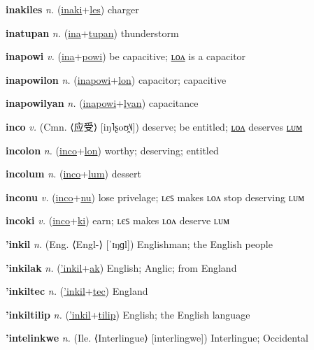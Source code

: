 \textbf{\hypertarget{inakiles}{inakiles}} \textit{n.} (\hyperlink{inaki}{inaki}+\allowbreak \hyperlink{les}{les})
charger

\textbf{\hypertarget{inatupan}{inatupan}} \textit{n.} (\hyperlink{ina}{ina}+\allowbreak \hyperlink{tupan}{tupan})
thunderstorm

\textbf{\hypertarget{inapowi}{inapowi}} \textit{v.} (\hyperlink{ina}{ina}+\allowbreak \hyperlink{powi}{powi})
be capacitive; \hyperlink{inapowilon}{ʟᴏᴧ} is a capacitor

\textbf{\hypertarget{inapowilon}{inapowilon}} \textit{n.} (\hyperlink{inapowi}{inapowi}+\allowbreak \hyperlink{lon}{lon})
capacitor; capacitive

\textbf{\hypertarget{inapowilyan}{inapowilyan}} \textit{n.} (\hyperlink{inapowi}{inapowi}+\allowbreak \hyperlink{lyan}{lyan})
capacitance

\textbf{\hypertarget{inco}{inco}} \textit{v.} (Cmn. ⟨{\chinese{}应受}⟩ [iŋ˥ʂoʊ̯˥˩])
deserve; be entitled; \hyperlink{incolon}{ʟᴏᴧ} deserves \hyperlink{incolum}{ʟᴜᴍ}

\textbf{\hypertarget{incolon}{incolon}} \textit{n.} (\hyperlink{inco}{inco}+\allowbreak \hyperlink{lon}{lon})
worthy; deserving; entitled

\textbf{\hypertarget{incolum}{incolum}} \textit{n.} (\hyperlink{inco}{inco}+\allowbreak \hyperlink{lum}{lum})
dessert

\textbf{\hypertarget{inconu}{inconu}} \textit{v.} (\hyperlink{inco}{inco}+\allowbreak \hyperlink{nu}{nu})
lose privelage; ʟєꜱ makes ʟᴏᴧ stop deserving ʟᴜᴍ

\textbf{\hypertarget{incoki}{incoki}} \textit{v.} (\hyperlink{inco}{inco}+\allowbreak \hyperlink{ki}{ki})
earn; ʟєꜱ makes ʟᴏᴧ deserve ʟᴜᴍ

\textbf{\hypertarget{'inkil}{'inkil}} \textit{n.} (Eng. ⟨Engl-⟩ [ˈɪŋɡl])
Englishman; the English people

\textbf{\hypertarget{'inkilak}{'inkilak}} \textit{n.} (\hyperlink{'inkil}{'inkil}+\allowbreak \hyperlink{ak}{ak})
English; Anglic; from England

\textbf{\hypertarget{'inkiltec}{'inkiltec}} \textit{n.} (\hyperlink{'inkil}{'inkil}+\allowbreak \hyperlink{tec}{tec})
England

\textbf{\hypertarget{'inkiltilip}{'inkiltilip}} \textit{n.} (\hyperlink{'inkil}{'inkil}+\allowbreak \hyperlink{tilip}{tilip})
English; the English language

\textbf{\hypertarget{'intelinkwe}{'intelinkwe}} \textit{n.} (Ile. ⟨Interlingue⟩ [interlingwe])
Interlingue; Occidental

